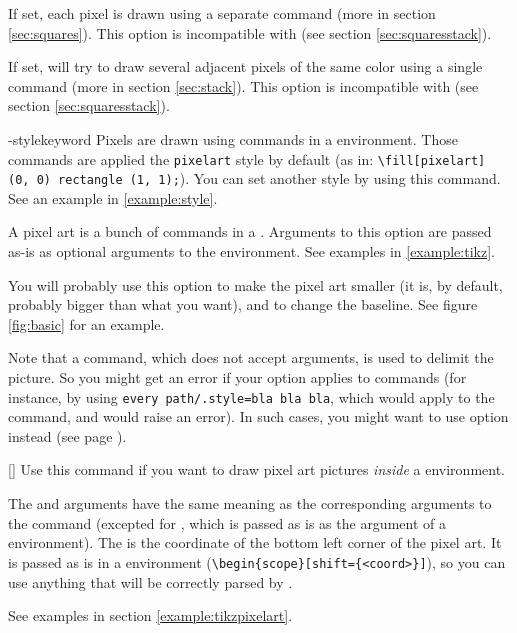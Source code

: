 \documentclass[
  load-preamble-,
  babel-options=english,
  add-index=true,
]{cnltx-doc}
\begin{document}
\begin{commands}
\begin{options}
     If set, each pixel is drawn using a separate  command (more in section \ref{sec:squares}). This option is incompatible with  (see section \ref{sec:squaresstack}).

     If set,  will try to draw several adjacent pixels of the same color using a single  command (more in section \ref{sec:stack}). This option is incompatible with  (see section \ref{sec:squaresstack}).

    \keyval-{style}{keyword}\label{option:style} Pixels are drawn using  commands in a  environment. Those  commands are applied the \texttt{pixelart} style by default (as in: \verb+\fill[pixelart] (0, 0) rectangle (1, 1);+). You can set another style by using this command. See an example in \ref{example:style}.

    \label{option:tikz} A pixel art is a bunch of  commands in a . Arguments to this option are passed as-is as optional arguments to the  environment. See examples in \ref{example:tikz}.

    You will probably use this option to make the pixel art smaller (it is, by default, probably bigger than what you want), and to change the baseline. See figure \ref{fig:basic} for an example.

    Note that a  command, which does not accept arguments, is used to delimit the picture. So you might get an error if your  option applies to  commands (for instance, by using \texttt{every path/.style={bla bla bla}}, which would apply to the  command, and would raise an error). In such cases, you might want to use option  instead (see page \pageref{option:style}).

  \end{options}

  []
  Use this command if you want to draw pixel art pictures \emph{inside} a  environment.

  The  and  arguments have the same meaning as the corresponding arguments to the  command (excepted for , which is passed as is as the argument of a  environment).
  The  is the coordinate of the bottom left corner of the pixel art. It is passed as is in a   environment (\verb+\begin{scope}[shift={<coord>}]+), so you can use anything that will be correctly parsed by .

  See examples in section \ref{example:tikzpixelart}.
\end{commands}
\end{document}
